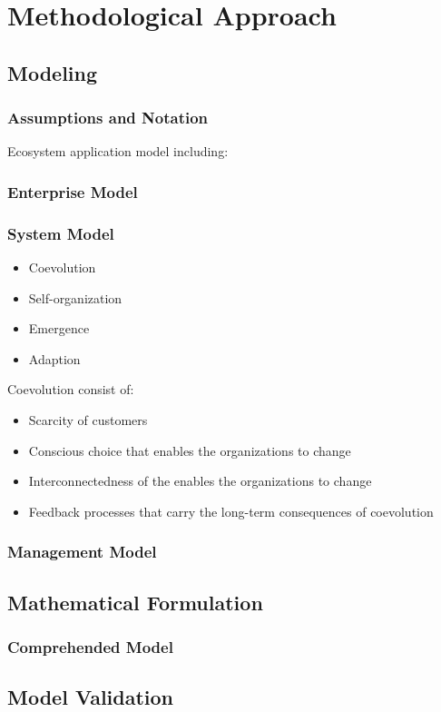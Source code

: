 \section{Methodological Approach} %
\label{sec:methodological_approach}

\subsection{Modeling} %
\label{sub:modeling}

\subsubsection{Assumptions and Notation}

Ecosystem application model including:
\subsubsection{Enterprise Model}

\subsubsection{System Model}
\begin{itemize}
	\item Coevolution
	\item Self-organization
	\item Emergence	
	\item Adaption
\end{itemize}

Coevolution consist of:
\begin{itemize}
	\item Scarcity of customers
	\item Conscious choice that enables the organizations to change
	\item Interconnectedness of the enables the organizations to change
	\item Feedback processes that carry the long-term consequences of coevolution
\end{itemize}

\subsubsection{Management Model}


\subsection{Mathematical Formulation} %
\label{sub:mathematical_formulation}
\subsubsection{Comprehended Model}

\subsection{Model Validation} %
\label{sub:model_validation}


